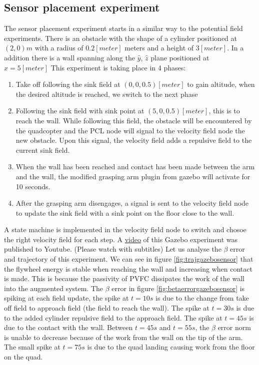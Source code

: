 \subsection{Sensor placement experiment}
The sensor placement experiment starts in a similar way to the potential field experiments. 
There is an obstacle with the shape of a cylinder positioned at $(2,0)m$ with a radius of $0.2[meter]$ meters and a height of $3[meter]$.
In a addition there is a wall spanning along the $\hat{y}$, $\hat{z}$ plane positioned at $x=5[meter]$
This experiment is taking place in 4 phases:
\begin{enumerate}
   \item Take off following the sink field at $(0,0,0.5)[meter]$ to gain altitude, when the desired altitude is reached, we switch to the next phase 
   \item Following the sink field with sink point at $(5,0,0.5)[meter]$, this is to reach the wall. While following this field, the obstacle will be encountered by the quadcopter and the PCL node will signal to the velocity field node the new obstacle. Upon this signal, the velocity field adds a repulsive field to the current sink field. 
   \item When the wall has been reached and contact has been made between the arm and the wall, the modified grasping arm plugin from gazebo will activate for 10 seconds.
   \item After the grasping arm disengages, a signal is sent to the velocity field node to update the sink field with a sink point on the floor close to the wall.
\end{enumerate}
A state machine is implemented in the velocity field node to switch and chosoe the right velocity field for each step. 
A \href{https://www.youtube.com/watch?v=bR4PmFp38t0}{video} of this Gazebo experiment was published to Youtube. (Please watch with subtitles)
Let us analyse the $\beta$ error and trajectory of this experiment.
We can see in figure \ref{fig:trajgazebosensor} that the flywheel energy is stable when reaching the wall and increasing when contact is made. This is because the passivity of PVFC dissipates the work of the wall into the augmented system.
The $\beta$ error in figure \ref{fig:betaerrorgazebosensor} is spiking at each field update, the spike at $t=10s$ is due to the change from take off field to approach field (the field to reach the wall). 
The spike at $t=30s$ is due to the added cylinder repulsive field to the approach field.
The spike at $t=45s$ is due to the contact with the wall. Between $t=45s$ and $t=55s$, the $\beta$ error norm is unable to decrease because of the work from the wall on the tip of the arm. 
The small spike at $t=75s$ is due to the quad landing causing work from the floor on the quad.


